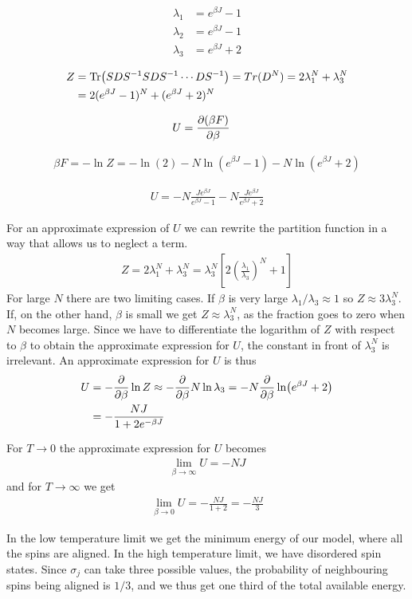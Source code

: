 \documentclass[reprint,english,notitlepage,aps,nobalancelastpage,nofootinbib]{revtex4-1}
\newcommand{\closed}[1]{\left(#1\right)}
\newcommand{\bracket}[1]{\left[#1\right]}
\newcommand{\ebj}{e^{\beta J}}
\renewcommand{\l}{\lambda}
\begin{document}
\begin{align*}
	\lambda_1 &= \ebj-1 \\ 
	\lambda_2 &= \ebj-1 \\ 
	\lambda_3 &= \ebj+2
\end{align*}

\begin{align*}
	Z &= \Tr(SDS^{-1}SDS^{-1}\cdots DS^{-1})=Tr(D^N)=2\lambda_1^N + \lambda_3^N \\ 
	&= 2(\ebj-1)^N + (\ebj+2)^N
\end{align*}

\begin{align*}
	U &= \pdv{(\beta F)}{\beta}
\end{align*}

\begin{align*}
	\beta F = -\ln Z = -\ln(2)-N\ln(\ebj-1)-N\ln(\ebj+2)
\end{align*}

\begin{align*}
	U = -N \frac{J\ebj}{\ebj-1} - N \frac{J\ebj}{\ebj+2}
\end{align*}

For an approximate expression of $U$ we can rewrite the partition function in a way that allows us to neglect a term. 
\begin{align*}
	Z = 2\l_1^N + \l_3^N = \l_3^N\bracket{2\closed{\frac{\l_1}{\l_3}}^N+1}
\end{align*} 
For large $N$ there are two limiting cases. If $\beta$ is very large $\l_1/\l_3\approx1$ so $Z\approx 3\l_3^N$. If, on the other hand, $\beta$ is small we get $Z\approx \l_3^N$, as the fraction goes to zero when $N$ becomes large. Since we have to differentiate the logarithm of $Z$ with respect to $\beta$ to obtain the approximate expression for $U$, the constant in front of $\l_3^N$ is irrelevant. An approximate expression for $U$ is thus 
\begin{align*}
	U&=-\pdv{\beta}\ln Z \approx -\pdv{\beta} N \ln \l_3 = -N \pdv{\beta}\ln (\ebj+2) \\ 
	&= -\frac{NJ}{1+2 e^{-\beta J}} 
\end{align*}

For $T\to0$ the approximate expression for $U$ becomes 
\begin{align*}
	\lim_{\beta\to\infty} U = -NJ
\end{align*}
and for $T\to\infty$ we get 
\begin{align*}
	\lim_{\beta\to0} U = -\frac{NJ}{1+2}=-\frac{NJ}{3}
\end{align*}

In the low temperature limit we get the minimum energy of our model, where all the spins are aligned. In the high temperature limit, we have disordered spin states. Since $\sigma_j$ can take three possible values, the probability of neighbouring spins being aligned is $1/3$, and we thus get one third of the total available energy.  
\end{document}
